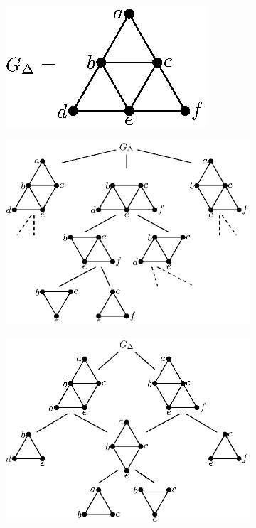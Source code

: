 \ClearMyMinHeight
{}

\begin{figure}\centering%
  \begin{subfigure}{0.4\linewidth}\centering
    \includegraphics[height=\myMinHeight]{img/epsfromtikz/demo_graph}
    \caption{}\label{fig:demo_graph:graph}
  \end{subfigure}%
  \hfill
  \begin{subfigure}{0.3\linewidth}\centering
    \includegraphics[height=\myMinHeight]{img/epsfromtikz/demo_graph_comdrp}
    \caption{}\label{fig:demo_graph:comdrp}
  \end{subfigure}%
  \hfill
  \begin{subfigure}{0.3\linewidth}\centering
    \includegraphics[height=\myMinHeight]{img/epsfromtikz/demo_graph_candrp}

\end{subfigure}
\end{figure}
